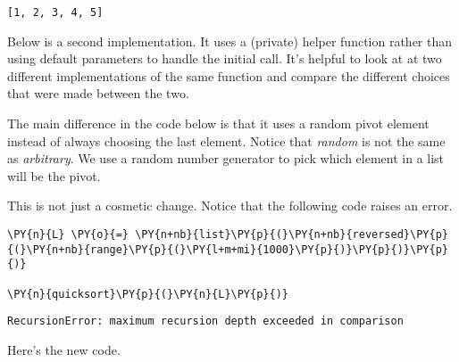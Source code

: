 \begin{Verbatim}
[1, 2, 3, 4, 5]

\end{Verbatim}


Below is a second implementation.
It uses a (private) helper function rather than using default parameters to handle the initial call.
It's helpful to look at at two different implementations of the same function and compare the different choices that were made between the two.


The main difference in the code below is that it uses a random pivot element instead of always choosing the last element.
Notice that \emph{random} is not the same as \emph{arbitrary}.
We use a random number generator to pick which element in a list will be the pivot.


This is not just a cosmetic change.
Notice that the following code raises an error.

\begin{Verbatim}[commandchars=\\\{\}]
\PY{n}{L} \PY{o}{=} \PY{n+nb}{list}\PY{p}{(}\PY{n+nb}{reversed}\PY{p}{(}\PY{n+nb}{range}\PY{p}{(}\PY{l+m+mi}{1000}\PY{p}{)}\PY{p}{)}\PY{p}{)}

\PY{n}{quicksort}\PY{p}{(}\PY{n}{L}\PY{p}{)}
\end{Verbatim}


\texttt{RecursionError: maximum recursion depth exceeded in comparison
}


Here's the new code.

